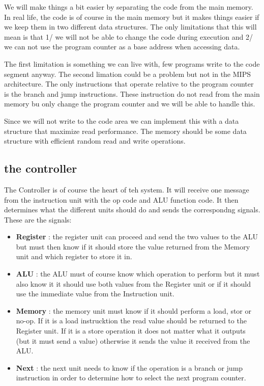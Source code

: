 \documentclass[a4paper,11pt]{article}
\begin{document}
We will make things a bit easier by separating the code from the main
memory. In real life, the code is of course in the main memory but it
makes things easier if we keep them in two different data
structures. The only limitations that this will mean is that 1/ we
will not be able to change the code during execution and 2/ we can not
use the program counter as a base address when accessing data.

The first limitation is something we can live with, few programs write
to the code segment anyway. The second limation could be a problem but
not in the MIPS architecture. The only instructions that operate
relative to the program counter is the branch and jump
instructions. These instruction do not read from the main memory bu
only change the program counter and we will be able to handle this.

Since we will not write to the code area we can implement this with a
data structure that maximize read performance. The memory should be
some data structure with efficient random read and write operations.


\subsection*{the controller}

The Controller is of course the heart of teh system. It will receive
one message from the instruction unit with the op code and ALU function
code. It then determines what the different units should do and sends
the correspondng signals. These are the signals:

\begin{itemize}

\item {\bf Register} : the register unit can proceed and send the two
  values to the ALU but must then know if it should store the value
  returned from the Memory unit and which register to store it in.

\item {\bf ALU} : the ALU must of course know which operation to
  perform but it must also know it it should use both values from the
  Register unit or if it should use the immediate value from the Instruction unit.

\item {\bf Memory} : the memory unit must know if it should perform a
  load, stor or no-op. If it is a load instrucktion the read value
  should be returned to the Register unit. If it is a store operation
  it does not matter what it outputs (but it must send a value)
  otherwise it sends the value it received from the ALU.

\item {\bf Next} : the next unit needs to know if the operation is a
  branch or jump instruction in order to determine how to select the
  next program counter.
  
\end{itemize}
\end{document}
